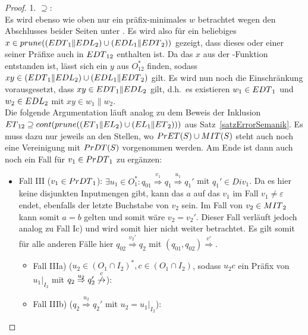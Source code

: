 \begin{proof}
  1. \glqq{}$\supseteq$\grqq{}:\\
  Es wird ebenso wie oben nur ein präfix-minimales $w$ betrachtet wegen den
  Abschlusses beider Seiten unter \cont{}. Es wird also für ein beliebiges
  $x\in prune{}((EDT{}_1\|EDL{}_2)\cup (EDL{}_1\|EDT{}_2))$ gezeigt, dass
  dieses oder einer seiner Präfixe auch in $EDT{}_{12}$ enthalten ist. Da das
  $x$ aus der \prune{}-Funktion entstanden ist, lässt sich ein $y$ aus
  $O_{12}^*$ finden, sodass $xy\in (EDT{}_1\|EDL{}_2)\cup
  (EDL{}_1\|EDT{}_2)$ gilt. Es wird nun noch die Einschränkung vorausgesetzt,
  dass \oBdA{} $xy\in EDT{}_1\|EDL{}_2$ gilt, d.h.\ es existieren
  $w_1\in EDT{}_1$ und $w_2\in EDL{}_2$ mit $xy\in w_1\|w_2$.\\
  Die folgende Argumentation läuft analog zu dem Beweis der Inklusion
  $ET{}_{12} \supseteq cont{}(prune{}((ET{}_1\|EL_2)\cup
  (EL{}_1\|ET{}_2)))$ aus Satz~\ref{satzErrorSemanik}. Es muss dazu nur
  jeweils an den Stellen, wo $PrET{}(S)\cup MIT{}(S)$ steht auch noch eine
  Vereinigung mit $PrDT{}(S)$ vorgenommen werden. Am Ende ist dann auch noch
  ein Fall für $v_1\in PrDT{}_1$ zu ergänzen:
  \begin{itemize}
    \item Fall III ($v_1\in PrDT{}_1$): $\exists u_1\in O_1^*: q_{01}
      \overset{v_1}{\Rightarrow} q_1 \overset{u_1}{\Rightarrow} q_1'$ mit
      $q_1'\in Div_1$. Da es hier keine disjunkten Inputmengen gibt, kann das
      $a$ auf das $v_1$ im Fall $v_1\neq \varepsilon$ endet, ebenfalls der
      letzte Buchstabe von $v_2$ sein. Im Fall von $v_2\in MIT{}_2$ kann somit
      $a=b$ gelten und somit wäre $v_2= v_2'$. Dieser Fall verläuft jedoch
      analog zu Fall Ic) und wird somit hier nicht weiter betrachtet. Es gilt
      somit für alle anderen Fälle hier $q_{02} \overset{v_2'}{\Rightarrow}
      q_2$ mit $(q_{01},q_{02}) \overset{v'}{\Rightarrow}$.
      \begin{itemize}
        \item Fall IIIa) ($u_2\in (O_1\cap I_2)^*, c\in (O_1\cap I_2)$, sodass
          $u_2c$ ein Präfix von $u_1|_{I_2}$ mit $q_2
          \overset{u_2}{\Rightarrow}
          q_2'\overset{c}{\not{\hspace{-0.1cm}\rightarrow}}$):
        \item Fall IIIb) ($q_2 \overset{u_2}{\Rightarrow} q_2'$ mit $u_2=
          u_1|_{I_2}$):
      \end{itemize}
  \end{itemize}


\end{proof}
